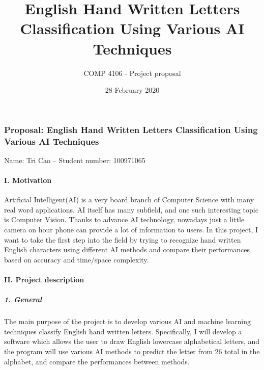 \documentclass[12pt,english,]{article}
\title{\Huge\textbf{English Hand Written Letters Classification Using Various AI Techniques}}
\subtitle{COMP 4106 - Project proposal}
\author{}
\date{28 February 2020}
\let\oldparagraph\paragraph
\renewcommand{\paragraph}[1]{\oldparagraph{#1}\mbox{}}
\let\oldsubparagraph\subparagraph
\renewcommand{\subparagraph}[1]{\oldsubparagraph{#1}\mbox{}}
\begin{document}
\maketitle


\newpage

\hypertarget{proposal-english-hand-written-letters-classification-using-various-ai-techniques}{%
\subsubsection{Proposal: English Hand Written Letters Classification
Using Various AI
Techniques}\label{proposal-english-hand-written-letters-classification-using-various-ai-techniques}}

Name: Tri Cao -- Student number: 100971065

\hypertarget{i.-motivation}{%
\paragraph{I. Motivation}\label{i.-motivation}}

Artificial Intelligent(AI) is a very board branch of Computer Science
with many real word applications. AI itself has many subfield, and one
such interesting topic is Computer Vision. Thanks to advance AI
technology, nowadays just a little camera on hour phone can provide a
lot of information to users. In this project, I want to take the first
step into the field by trying to recognize hand written English
characters using different AI methods and compare their performances
based on accuracy and time/space complexity.

\hypertarget{ii.-project-description}{%
\paragraph{II. Project description}\label{ii.-project-description}}

\hypertarget{general}{%
\subparagraph{1. General}\label{general}}

The main purpose of the project is to develop various AI and machine
learning techniques classify English hand written letters. Specifically,
I will develop a software which allows the user to draw English
lowercase alphabetical letters, and the program will use various AI
methods to predict the letter from 26 total in the alphabet, and compare
the performances between methods.
\end{document}
